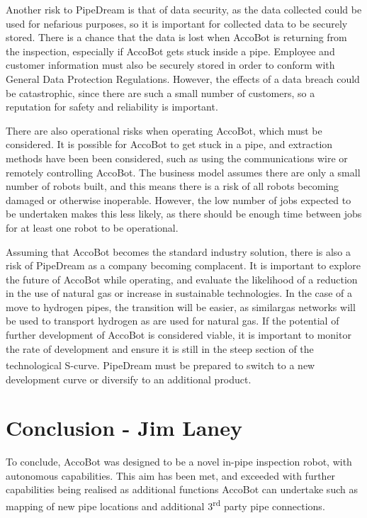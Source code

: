 \documentclass[11pt]{article}		%
\newcommand{\supercite}[1]{\textsuperscript{\cite{#1}}}		%
\begin{document}
		     	Another risk to PipeDream is that of data security, as the data collected could be used for nefarious purposes, so it is important for collected data to be securely stored.
		     	There is a chance that the data is lost when AccoBot is returning from the inspection, especially if AccoBot gets stuck inside a pipe.
		     	Employee and customer information must also be securely stored in order to conform with General Data Protection Regulations.
		     	However, the effects of a data breach could be catastrophic, since there are such a small number of customers, so a reputation for safety and reliability is important.
		     	
		     	There are also operational risks when operating AccoBot, which must be considered.
		     	It is possible for AccoBot to get stuck in a pipe, and extraction methods have been been considered, such as using the communications wire or remotely controlling AccoBot.
		     	The business model assumes there are only a small number of robots built, and this means there is a risk of all robots becoming damaged or otherwise inoperable.
		     	However, the low number of jobs expected to be undertaken makes this less likely, as there should be enough time between jobs for at least one robot to be operational.
		     	
		     	Assuming that AccoBot becomes the standard industry solution, there is also a risk of PipeDream as a company becoming complacent.
		     	It is important to explore the future of AccoBot while operating, and evaluate the likelihood of a reduction in the use of natural gas or increase in sustainable technologies.
		     	In the case of a move to hydrogen pipes, the transition will be easier, as similargas networks will be used to transport hydrogen as are used for natural gas.
		     	If the potential of further development of AccoBot is considered viable, it is important to monitor the rate of development and ensure it is still in the steep section of the technological S-curve\supercite{christensen1998innovation}.
		     	PipeDream must be prepared to switch to a new development curve or diversify to an additional product.
			    
    \section[Conclusion]{Conclusion - Jim Laney}
        
        To conclude, AccoBot was designed to be a novel in-pipe inspection robot, with autonomous capabilities.
        This aim has been met, and exceeded with further capabilities being realised as additional functions AccoBot can undertake such as mapping of new pipe locations and additional 3\textsuperscript{rd} party pipe connections.
        
\end{document}
